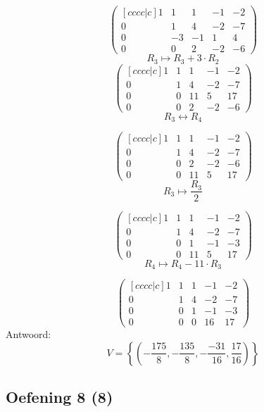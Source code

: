 \documentclass[lineaire_algebra_oplossingen.tex]{subfiles}
\begin{document}
\[
\begin{pmatrix}[cccc|c]
1 & 1 & 1 & -1 & -2\\
0 & 1 & 4 & -2 & -7\\
0 & -3 & -1 & 1 & 4\\
0 & 0 & 2 & -2 & -6
\end{pmatrix}
\]
\[ R_3 \longmapsto R_3 + 3\cdot R_2\]
\[
\begin{pmatrix}[cccc|c]
1 & 1 & 1 & -1 & -2\\
0 & 1 & 4 & -2 & -7\\
0 & 0 & 11 & 5 & 17\\
0 & 0 & 2 & -2 & -6
\end{pmatrix}
\]
\[ R_3 \leftrightarrow R_4\]

\[
\begin{pmatrix}[cccc|c]
1 & 1 & 1 & -1 & -2\\
0 & 1 & 4 & -2 & -7\\
0 & 0 & 2 & -2 & -6\\
0 & 0 & 11 & 5 & 17
\end{pmatrix}
\]
\[ R_3 \longmapsto  \frac{R_3}{2}
\]

\[
\begin{pmatrix}[cccc|c]
1 & 1 & 1 & -1 & -2\\
0 & 1 & 4 & -2 & -7\\
0 & 0 & 1 & -1 & -3\\
0 & 0 & 11 & 5 & 17
\end{pmatrix}
\]
\[ R_4 \longmapsto R_4 - 11\cdot R_3\]

\[
\begin{pmatrix}[cccc|c]
1 & 1 & 1 & -1 & -2\\
0 & 1 & 4 & -2 & -7\\
0 & 0 & 1 & -1 & -3\\
0 & 0 & 0 & 16 & 17
\end{pmatrix}
\]
Antwoord:
\[
V = \left\{\left( -\frac{175}{8},-\frac{135}{8}, -\frac{-31}{16}, \frac{17}{16} \right)\right\}
\]
\subsection{Oefening 8 (8)}
\end{document}
